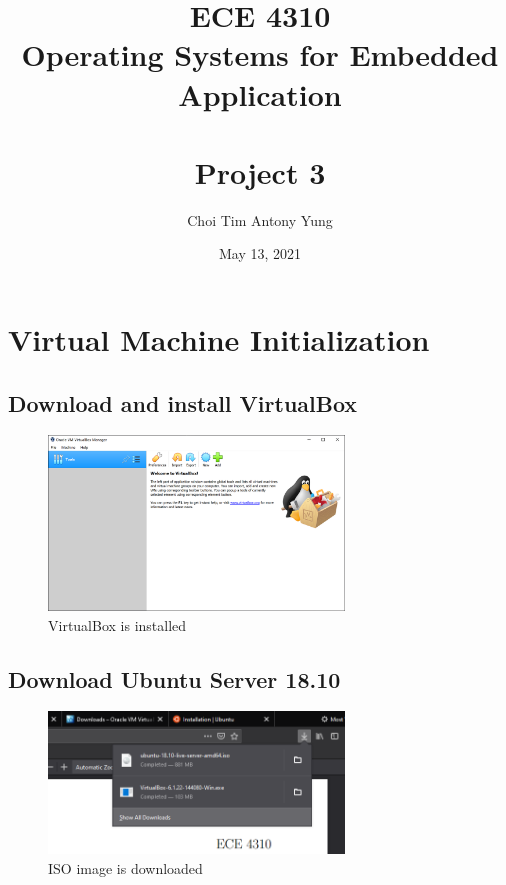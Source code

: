 \documentclass{article}
\title{ECE 4310\\Operating Systems for Embedded Application\\\,\\Project 3}
\author{Choi Tim Antony Yung}
\date{May 13, 2021}
\begin{document}
\maketitle

\thispagestyle{empty}
\setcounter{page}{0}

\newpage

\section{Virtual Machine Initialization}

\subsection{Download and install VirtualBox}
\begin{figure}[H]
  \caption{VirtualBox is installed}
  \centering
  \includegraphics[width=0.7\textwidth]{ECE4310_Proj3_1_installed.png}
\end{figure}

\subsection{Download Ubuntu Server 18.10}
\begin{figure}[H]
  \caption{ISO image is downloaded}
  \centering
  \includegraphics[width=0.7\textwidth]{ECE4310_Proj3_1_downloaded.png}
\end{figure}
\end{document}
